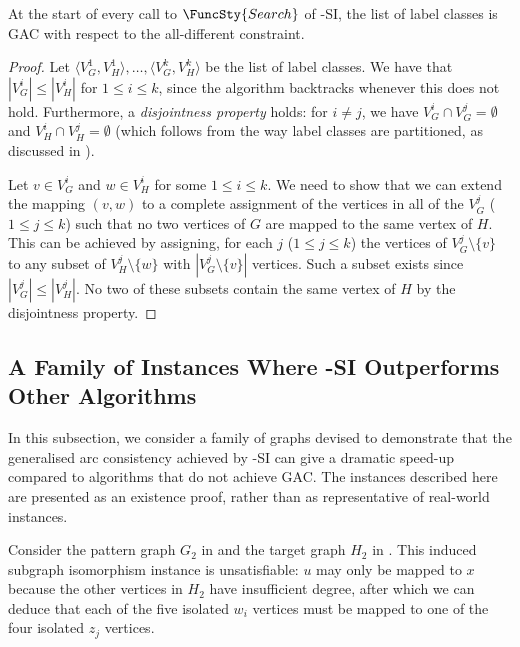 \begin{proposition}\label{gacProposition}
    At the start of every call to $\FuncSty{Search}$ of
    \McSplit-SI, the list of label classes is GAC with respect to 
    the all-different constraint.
\end{proposition}

\begin{proof}
Let $\langle V_G^1, V_H^1 \rangle, \dots, \langle V_G^k, V_H^k \rangle$ be the list of
label classes.  
We have that $|V_G^i| \leq |V_H^i|$ for $1 \leq i \leq k$, since the algorithm
backtracks whenever this does not hold.
Furthermore, a \emph{disjointness property} holds: for $i \not= j$, we have
    $V_G^i \cap V_G^j = \emptyset$ and $V_H^i \cap V_H^j =
    \emptyset$ (which follows from the way label classes are partitioned,
    as discussed in ).

Let $v \in V_G^i$ and $w \in V_H^i$ for some $1 \leq i \leq k$.  We need to show that we
can extend the mapping
$(v,w)$ to a complete assignment of the vertices in all of the $V_G^j$ ($1 \leq j \leq k$)
such that no two vertices of $G$ are mapped to the same vertex of $H$.
This can be achieved by assigning, for each $j$ ($1 \leq j \leq k$) the vertices of
$V_G^j \setminus \{v\}$ to any subset of
$V_H^j \setminus \{w\}$ with $|V_G^j \setminus \{v\}|$ vertices.
Such a subset exists since $|V_G^j| \leq |V_H^j|$. No two of these subsets
contain the same vertex of $H$ by the disjointness property.
\end{proof}

\subsection{A Family of Instances Where \McSplit-SI Outperforms Other Algorithms}

In this subsection, we consider a family of graphs devised to demonstrate
that the generalised arc consistency achieved by \McSplit-SI can give a dramatic
speed-up compared to algorithms that do not achieve GAC.
The instances described here are presented as an existence proof, rather than
as representative of real-world instances.

Consider the pattern graph $G_2$ in  and the target
graph $H_2$ in .  This induced subgraph isomorphism
instance is unsatisfiable: $u$ may only be mapped to $x$ because the other
vertices in $H_2$ have insufficient degree, after which we can deduce
that each of the five isolated $w_i$ vertices must be mapped to one of the four
isolated $z_j$ vertices.

